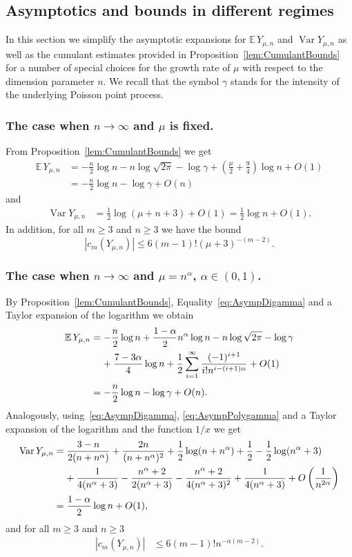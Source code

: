 \documentclass[AHL,Unicode,longabstracts,published]{cedram}
\newcommand{\EE}{\mathbb{E}\,}
\newcommand{\Var}{\mathop{\mathrm{Var}}\nolimits}
\begin{document}
\subsection{Asymptotics and bounds in different regimes}\label{subsec:CumSpecial}

In this section we simplify the asymptotic expansions for $\EE Y_{\mu,n}$ and $\Var Y_{\mu,n}$ as well as the cumulant estimates provided in Proposition~\ref{lem:CumulantBounds} for a number of special choices for the growth rate of $\mu$ with respect to the dimension parameter $n$. We recall that the symbol $\gamma$ stands for the intensity of the underlying Poisson point process.

\subsubsection{The case when $n\rightarrow \infty$ and $\mu$ is fixed.}
From Proposition~\ref{lem:CumulantBounds} we get
\begin{align*}
\EE Y_{\mu,n}&=-\frac{n}{2}\log n-n\log\sqrt{2\pi}-\log\gamma +\left(\frac{\mu}{2}+\frac{9}{4}\right)\log n+O(1)\\
&= -\frac{n}{2}\log n-\log\gamma+O(n)
\end{align*}
and
\begin{align*}
\Var Y_{\mu,n}&=\frac12\log(\mu+n+3)+O(1)= \frac12\log n+O(1).
\end{align*}
In addition, for all $m\geq 3$ and $n\ge 3$ we have the bound
\[
|c_m(Y_{\mu,n})|\leq 6(m-1)!(\mu+3)^{-(m-2)}.
\]

\subsubsection{The case when $n\rightarrow \infty$ and $\mu=n^{\alpha}$, $\alpha \in (0,1)$.}
By Proposition~\ref{lem:CumulantBounds}, Equality~\eqref{eq:AsympDigamma} and a Taylor expansion of the logarithm we obtain
\begin{align*}
\EE Y_{\mu,n}&=-\frac{n}{2}\log n+\frac{1-\alpha}{2}n^{\alpha}\log n-n\log\sqrt{2\pi}-\log\gamma\\
&\mkern20mu +\frac{7-3\alpha}{4}\log n+\frac12\sum\limits_{i=1}^{\infty}\frac{(-1)^{i+1}}{i!n^{i-(i+1)\alpha}}+O(1)\\[0.20em]
&= -\frac{n}{2}\log n-\log\gamma + O(n).
\end{align*}
Analogously, using~\eqref{eq:AsympDigamma}, \eqref{eq:AsympPolygamma} and a Taylor expansion of the logarithm and the function $1/x$ we get
\begin{align*}
\Var Y_{\mu,n}&=\frac{3-n}{2(n+n^\alpha)}+\frac{2n}{(n+n^\alpha)^2}+\frac{1}{2}\log(n+n^\alpha)+\frac{1}{2}-\frac{1}{2}\log(n^\alpha+3)\\
&\mkern20mu+\frac{1}{4(n^\alpha+3)}-\frac{n^\alpha+2}{2(n^\alpha+3)}-\frac{n^\alpha+2}{4(n^\alpha+3)^2}+\frac{1}{4(n^\alpha+3)}+O\left(\frac{1}{n^{2\alpha}}\right)\\[0.20em]
&=\frac{1-\alpha}{2}\log n+ O(1),
\end{align*}
and for all $m\geq 3$ and $n\geq 3$
\begin{align*}
|c_m(Y_{\mu,n})|&\leq 6(m-1)!n^{-\alpha(m-2)}.
\end{align*}
\end{document}
